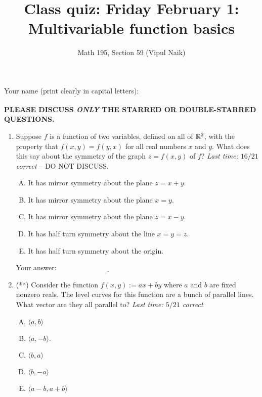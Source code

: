 \documentclass[10pt]{amsart}
\title{Class quiz: Friday February 1:  Multivariable function basics}
\author{Math 195, Section 59 (Vipul Naik)}
\begin{document}
\maketitle

Your name (print clearly in capital letters): $\underline{\qquad\qquad\qquad\qquad\qquad\qquad\qquad\qquad\qquad\qquad}$

{\bf PLEASE DISCUSS {\em ONLY} THE STARRED OR DOUBLE-STARRED QUESTIONS.}

\begin{enumerate}

\item Suppose $f$ is a function of two variables, defined on all of
  $\mathbb{R}^2$, with the property that $f(x,y) = f(y,x)$ for all real
  numbers $x$ and $y$. What does this say about the symmetry of the
  graph $z = f(x,y)$ of $f$? {\em Last time: $16/21$ correct} -- DO
  NOT DISCUSS.

  \begin{enumerate}[(A)]
  \item It has mirror symmetry about the plane $z = x + y$.
  \item It has mirror symmetry about the plane $x = y$.
  \item It has mirror symmetry about the plane $z = x - y$.
  \item It has half turn symmetry about the line $x = y = z$.
  \item It has half turn symmetry about the origin.
  \end{enumerate}

  \vspace{0.05in}
  Your answer: $\underline{\qquad\qquad\qquad\qquad\qquad\qquad\qquad}$
  \vspace{0.5in}

\item (**) Consider the function $f(x,y) := ax + by$ where $a$ and $b$ are
  fixed nonzero reals. The level curves for this function are a bunch
  of parallel lines. What vector are they all parallel to? {\em Last
  time: $5/21$ correct}

  \begin{enumerate}[(A)]
  \item $\langle a,b \rangle$
  \item $\langle a,-b \rangle$.
  \item $\langle b,a \rangle$
  \item $\langle b,-a \rangle$
  \item $\langle a - b, a + b \rangle$
  \end{enumerate}


\end{enumerate}
\end{document}
